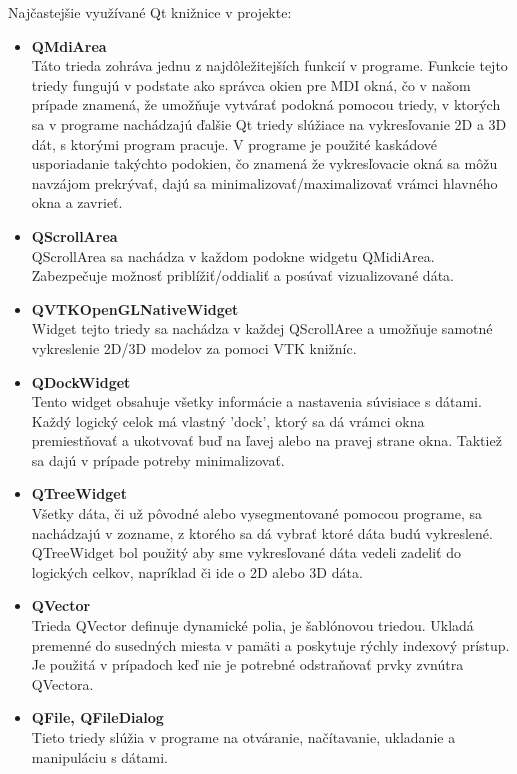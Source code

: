 \documentclass[a4paper,11pt,twoside]{article}%
\begin{document}
Najčastejšie využívané Qt knižnice v projekte:
\begin{itemize}
\item \textbf{QMdiArea}\\ 
Táto trieda zohráva jednu z najdôležitejších funkcií v programe. Funkcie tejto triedy fungujú v podstate ako správca okien pre MDI okná, čo v našom prípade znamená, že umožňuje vytvárať podokná pomocou triedy, v ktorých sa v programe nachádzajú ďalšie Qt triedy slúžiace na vykresľovanie 2D a 3D dát, s ktorými program pracuje. V programe je použité kaskádové usporiadanie takýchto podokien, čo znamená že vykresľovacie okná sa môžu navzájom prekrývať, dajú sa minimalizovať/maximalizovať vrámci hlavného okna a zavrieť.

\item \textbf{QScrollArea} \\
QScrollArea sa nachádza v každom podokne widgetu QMidiArea. Zabezpečuje možnosť priblížiť/oddialiť a posúvať vizualizované dáta.  

\item \textbf{QVTKOpenGLNativeWidget} \\
Widget tejto triedy sa nachádza v každej QScrollAree a umožňuje samotné vykreslenie 2D/3D modelov za pomoci VTK knižníc. 

\item \textbf{QDockWidget} \\
Tento widget obsahuje všetky informácie a nastavenia súvisiace s dátami. Každý logický celok má vlastný 'dock', ktorý sa dá vrámci okna premiestňovať a ukotvovať buď na ľavej alebo na pravej strane okna. Taktiež sa dajú v prípade potreby minimalizovať.

\item \textbf{QTreeWidget} \\ 
Všetky dáta, či už pôvodné alebo vysegmentované pomocou programe, sa nachádzajú v zozname, z ktorého sa dá vybrať ktoré dáta budú vykreslené. QTreeWidget bol použitý aby sme vykresľované dáta vedeli zadeliť do logických celkov, napríklad či ide o 2D alebo 3D dáta.

\item \textbf{QVector} \\
Trieda QVector definuje dynamické polia, je šablónovou triedou.
Ukladá premenné do susedných miesta v pamäti a poskytuje rýchly indexový prístup. Je použitá v prípadoch keď nie je potrebné odstraňovať prvky zvnútra QVectora.

\item \textbf{QFile, QFileDialog} \\
Tieto triedy slúžia v programe na otváranie, načítavanie, ukladanie a manipuláciu s dátami.

\end{itemize}
\end{document}

